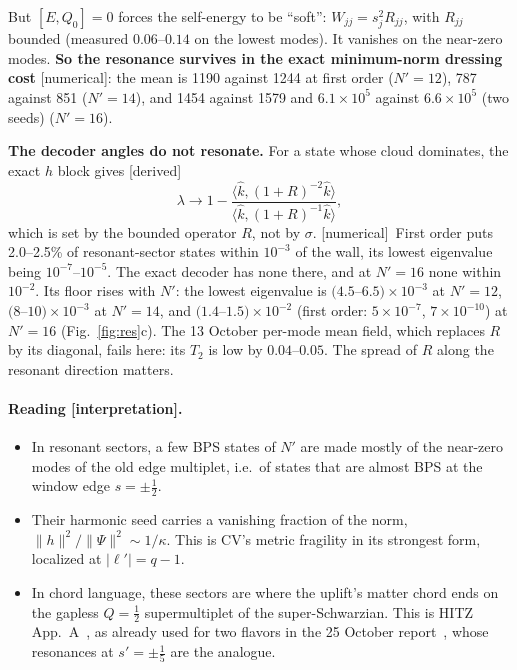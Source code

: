 \documentclass[11pt]{article}
\newcommand{\Np}{N'}
\newcommand{\lp}{\ell'}
\newcommand{\ip}[2]{\langle #1,#2\rangle}
\newcommand{\tagbox}[2]{\textsf{\small\color{#1}[#2]}}
\newcommand{\DER}{\tagbox{cder}{derived}}
\newcommand{\NUM}{\tagbox{cnum}{numerical}}
\newcommand{\INTERP}{\tagbox{cconj}{interpretation}}
\theoremstyle{plain}
\theoremstyle{remark}
\numberwithin{equation}{section}
\begin{document}
But $[E,Q_0]=0$ forces the self-energy to be ``soft'': $W_{jj}=s_j^2R_{jj}$, with $R_{jj}$ bounded (measured
$0.06$--$0.14$ on the lowest modes). It vanishes on the near-zero modes. \textbf{So the resonance survives in the exact
minimum-norm dressing cost} \NUM: the mean is 1190 against 1244 at first order ($\Np=12$), 787 against 851 ($\Np=14$),
and 1454 against 1579 and $6.1\times10^5$ against $6.6\times10^5$ (two seeds) ($\Np=16$).

\textbf{The decoder angles do not resonate.} For a state whose cloud dominates, the exact $h$ block gives \DER
\begin{equation}
\lambda\to1-\frac{\ip{\hat k}{(1+R)^{-2}\hat k}}{\ip{\hat k}{(1+R)^{-1}\hat k}},
\end{equation}
which is set by the bounded operator $R$, not by $\sigma$. \NUM\ First order puts 2.0--2.5\% of resonant-sector states
within $10^{-3}$ of the wall, its lowest eigenvalue being $10^{-7}$--$10^{-5}$. The exact decoder has none there, and at
$\Np=16$ none within $10^{-2}$. Its floor rises with $\Np$: the lowest eigenvalue is $(4.5$--$6.5)\times10^{-3}$ at
$\Np=12$, $(8$--$10)\times10^{-3}$ at $\Np=14$, and $(1.4$--$1.5)\times10^{-2}$ (first order: $5\times10^{-7}$, $7\times10^{-10}$) at $\Np=16$ (Fig.~\ref{fig:res}c). The 13 October per-mode mean field, which replaces $R$ by its diagonal, fails here: its $T_2$
is low by $0.04$--$0.05$. The spread of $R$ along the resonant direction matters.

\paragraph{Reading \INTERP.}
\begin{itemize}\itemsep1pt
\item In resonant sectors, a few BPS states of $\Np$ are made mostly of the near-zero modes of the old edge multiplet,
i.e.\ of states that are almost BPS at the window edge $s=\pm\tfrac12$.
\item Their harmonic seed carries a vanishing fraction of the norm, $\|h\|^2/\|\Psi\|^2\sim1/\kappa$. This is CV's
metric fragility in its strongest form, localized at $|\lp|=q-1$.
\item In chord language, these sectors are where the uplift's matter chord ends on the gapless $Q=\tfrac12$ supermultiplet
of the super-Schwarzian. This is HITZ App.~A~\cite{HITZ}, as already used for two flavors in the 25 October
report~\cite{prog1025}, whose resonances at $s'=\pm\tfrac15$ are the analogue.
\end{itemize}
\end{document}
